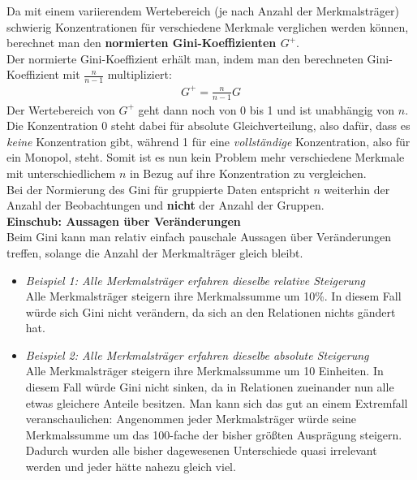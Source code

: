 \documentclass[a4paper]{article}
\newcommand\dangersign[1][2ex]{%
  \renewcommand\stacktype{L}%
  \scaleto{\stackon[1.3pt]{\color{red}$\triangle$}{\tiny !}}{#1}%
}
\begin{document}
\noindent Da mit einem variierendem Wertebereich (je nach Anzahl der Merkmalsträger) schwierig Konzentrationen für verschiedene Merkmale verglichen werden können, berechnet man den \textbf{normierten Gini-Koeffizienten $G^+$}.\\
Der normierte Gini-Koeffizient erhält man, indem man den berechneten Gini-Koeffizient mit $\frac{n}{n-1}$ multipliziert:
\begin{align*}
    G^+=\frac{n}{n-1}G
\end{align*}
Der Wertebereich von $G^+$ geht dann noch von 0 bis 1 und ist unabhängig von $n$. Die Konzentration 0 steht dabei für absolute Gleichverteilung, also dafür, dass es \textit{keine} Konzentration gibt, während 1 für eine \textit{vollständige} Konzentration, also für ein Monopol, steht. Somit ist es nun kein Problem mehr verschiedene Merkmale mit unterschiedlichem $n$ in Bezug auf ihre Konzentration zu vergleichen.\\

\noindent \dangersign[3ex] Bei der Normierung des Gini für gruppierte Daten entspricht $n$ weiterhin der Anzahl der Beobachtungen und \textbf{nicht} der Anzahl der Gruppen.\\

\noindent \textbf{Einschub: Aussagen über Veränderungen}\\
Beim Gini kann man relativ einfach pauschale Aussagen über Veränderungen treffen, solange die Anzahl der Merkmalträger gleich bleibt.
\begin{itemize}
    \item \textit{Beispiel 1: Alle Merkmalsträger erfahren dieselbe relative Steigerung}\\
    Alle Merkmalsträger steigern ihre Merkmalssumme um 10\%. In diesem Fall würde sich Gini nicht verändern, da sich an den Relationen nichts gändert hat.
    \item \textit{Beispiel 2: Alle Merkmalsträger erfahren dieselbe absolute Steigerung}\\
    Alle Merkmalsträger steigern ihre Merkmalssumme um 10 Einheiten. In diesem Fall würde Gini nicht sinken, da in Relationen zueinander nun alle etwas gleichere Anteile besitzen. Man kann sich das gut an einem Extremfall veranschaulichen: Angenommen jeder Merkmalsträger würde seine Merkmalssumme um das 100-fache der bisher größten Ausprägung steigern. Dadurch wurden alle bisher dagewesenen Unterschiede quasi irrelevant werden und jeder hätte nahezu gleich viel. 
\end{itemize}
\end{document}
